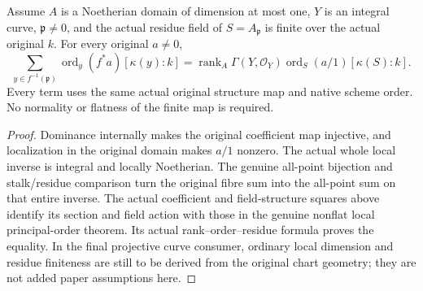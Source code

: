 \begin{theorem}
\label{thm:fc-finite-fibre-all-native-principal-orders}
\leanok
{}
Assume $A$ is a Noetherian domain of dimension at most one, $Y$ is an
integral curve, $\mathfrak p\ne0$, and the actual residue field of
$S=A_{\mathfrak p}$ is finite over the actual original $k$.  For every
original $a\ne0$,
\[
 \sum_{y\in f^{-1}(\mathfrak p)}
 \operatorname{ord}_y(f^*a)[\kappa(y):k]
 =\operatorname{rank}_A\Gamma(Y,\mathcal O_Y)
   \operatorname{ord}_S(a/1)[\kappa(S):k].
\]
Every term uses the same actual original structure map and native
scheme order.  No normality or flatness of the finite map is required.
\end{theorem}
\begin{proof}
Dominance internally makes the original coefficient map injective, and
localization in the original domain makes $a/1$ nonzero.  The actual whole
local inverse is integral and locally Noetherian.  The genuine all-point
bijection and stalk/residue comparison turn the original fibre sum into
the all-point sum on that entire inverse.  The actual coefficient and
field-structure squares above identify its section and field action with
those in the genuine nonflat local principal-order theorem.  Its actual
rank--order--residue formula proves the equality.  In the final projective
curve consumer, ordinary local dimension and residue finiteness are still
to be derived from the original chart geometry; they are not added paper
assumptions here.
\end{proof}
